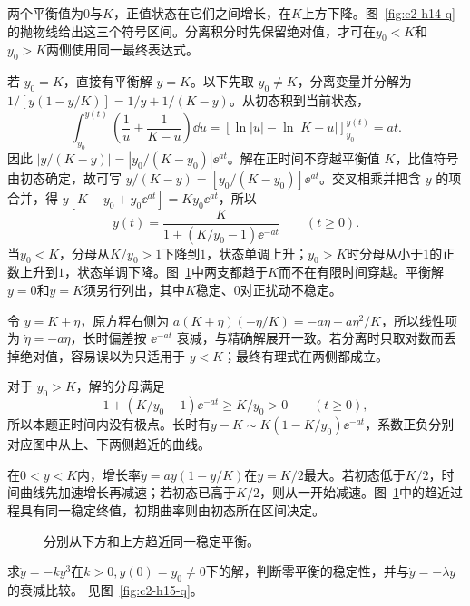 \begin{solution}
两个平衡值为$0$与$K$，正值状态在它们之间增长，在$K$上方下降。图~\ref{fig:c2-h14-q}的抛物线给出这三个符号区间。分离积分时先保留绝对值，才可在$y_0<K$和$y_0>K$两侧使用同一最终表达式。


若 $y_0=K$，直接有平衡解 $y=K$。以下先取 $y_0\ne K$，分离变量并分解为 $1/[y(1-y/K)]=1/y+1/(K-y)$。从初态积到当前状态，
\[
\int_{y_0}^{y(t)}\left(\frac1u+\frac1{K-u}\right)\dd u
=[\ln|u|-\ln|K-u|]_{y_0}^{y(t)}=at.
\]
因此 $|y/(K-y)|=|y_0/(K-y_0)|\ee^{at}$。解在正时间不穿越平衡值 $K$，比值符号由初态确定，故可写 $y/(K-y)=[y_0/(K-y_0)]\ee^{at}$。交叉相乘并把含 $y$ 的项合并，得 $y[K-y_0+y_0\ee^{at}]=Ky_0\ee^{at}$，所以
\[\boxed{y(t)=\frac K{1+(K/y_0-1)\ee^{-at}}\qquad(t\ge0)}.
\]
当$y_0<K$，分母从$K/y_0>1$下降到$1$，状态单调上升；$y_0>K$时分母从小于$1$的正数上升到$1$，状态单调下降。图~\ref{fig:c2-h14-s}中两支都趋于$K$而不在有限时间穿越。平衡解$y=0$和$y=K$须另行列出，其中$K$稳定、$0$对正扰动不稳定。

令 $y=K+\eta$，原方程右侧为 $a(K+\eta)(-\eta/K)=-a\eta-a\eta^2/K$，所以线性项为 $\dot\eta=-a\eta$，长时偏差按 $\ee^{-at}$ 衰减，与精确解展开一致。若分离时只取对数而丢掉绝对值，容易误以为只适用于 $y<K$；最终有理式在两侧都成立。


对于 $y_0>K$，解的分母满足
\[1+(K/y_0-1)\ee^{-at}\ge K/y_0>0\qquad(t\ge0),\]
所以本题正时间内没有极点。长时有$y-K\sim K(1-K/y_0)\ee^{-at}$，系数正负分别对应图中从上、下两侧趋近的曲线。

在$0<y<K$内，增长率$\dot y=ay(1-y/K)$在$y=K/2$最大。若初态低于$K/2$，时间曲线先加速增长再减速；若初态已高于$K/2$，则从一开始减速。图~\ref{fig:c2-h14-s}中的趋近过程具有同一稳定终值，初期曲率则由初态所在区间决定。

\begin{figure}[H]\centering
{}
\caption{分别从下方和上方趋近同一稳定平衡。}\label{fig:c2-h14-s}
\end{figure}
\end{solution}

\begin{exercise}[线性化失效时的幂律弛豫]\label{ex:c2-h15}
求$\dot y=-ky^3$在$k>0,y(0)=y_0\ne0$下的解，判断零平衡的稳定性，并与$\dot y=-\lambda y$的衰减比较。 见图~\ref{fig:c2-h15-q}。
\end{exercise}

